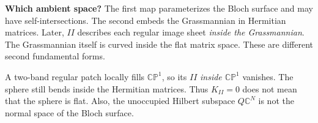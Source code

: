 \documentclass[11pt,a4paper]{article}
\newcommand{\Gr}{\operatorname{Gr}}
\newcommand{\Herm}{\operatorname{Herm}}
\newcommand{\CP}{\mathbb{CP}}
\begin{document}
\begin{center}
\end{center}
\textbf{Which ambient space?} The first map parameterizes the Bloch surface
and may have self-intersections. The second embeds the Grassmannian in
Hermitian matrices. Later, $II$ describes each regular image sheet
\emph{inside the Grassmannian}. The Grassmannian itself is curved inside the
flat matrix space. These are different second fundamental forms.
\begin{cautionbox}
A two-band regular patch locally fills $\CP^1$, so its $II$
\emph{inside $\CP^1$} vanishes. The sphere still bends inside the Hermitian
matrices. Thus $K_{II}=0$ does not mean that the sphere is flat.
Also, the unoccupied Hilbert subspace $Q\mathbb C^N$ is not the normal space
of the Bloch surface.
\end{cautionbox}
\end{document}
